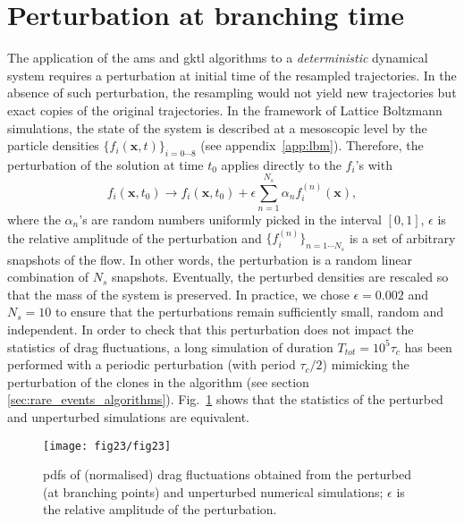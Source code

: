 \section{Perturbation at branching time}
\label{app:perturb_branching_time}
The application  of the \ac{ams} and \ac{gktl} algorithms to a \emph{deterministic} dynamical system requires a perturbation at initial time of the
resampled trajectories. In the absence of such perturbation, the resampling would not yield new trajectories but exact copies of the original trajectories.
In the framework of Lattice Boltzmann simulations, the state of the system is described at a mesoscopic level by the particle densities $\{f_i(\mathbf{x},t)\}_{i=0\cdots8}$ (see appendix~\ref{app:lbm}).
%
Therefore, the perturbation of the solution at time $t_0$ applies directly to the $f_i$'s with 
\begin{equation}
f_{i}(\mathbf{x},t_0) \longrightarrow f_i(\mathbf{x},t_0) + \epsilon \sum_{n=1}^{N_s} \alpha_{n}f_{i}^{(n)}(\mathbf{x}),
\label{eq:perturb_pop}
\end{equation}
where the $\alpha_n$'s are random numbers uniformly picked in the interval $[0,1]$, $\epsilon$ is the relative amplitude of the perturbation and $\{f_i^{(n)}\}_{n=1 \cdots N_s}$ is a set of arbitrary snapshots of the flow. 
%
In other words, the perturbation is a  random linear combination of $N_s$ snapshots.
Eventually, the perturbed densities are rescaled so that the mass of the system is preserved.
%
In practice, we chose $\epsilon = 0.002$ and $N_s = 10$ to ensure that the perturbations remain sufficiently small, random and independent.
%
In order to check that this perturbation does not impact the statistics of drag fluctuations, a long simulation of duration $T_{tot} = 10^5 \tau_c$ has been performed with a periodic perturbation (with period $\tau_c / 2$) mimicking the perturbation of the clones in the algorithm (see section \ref{sec:rare_events_algorithms}).
%
Fig.~\ref{fig:pdf_drag_with_perturbation} shows that the statistics of the perturbed and unperturbed simulations are equivalent.

\begin{figure}
  \centering
\texttt{[image: fig23/fig23]}
\caption{\ac{pdf}s of (normalised) drag fluctuations obtained from the perturbed (at branching points) and unperturbed numerical simulations; $\epsilon$ is the relative amplitude of the perturbation.}
\label{fig:pdf_drag_with_perturbation}
\end{figure}
